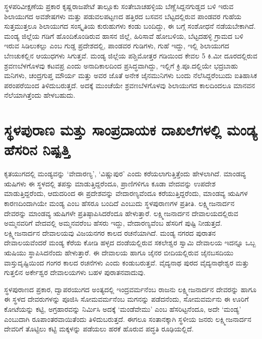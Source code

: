 \vskip -3pt

ಸ್ಥಳಪರಿವೀಕ್ಷಣೆಯ ಪ್ರಕಾರ ಕೃಷ್ಣರಾಜಪೇಟೆ ತಾಲ್ಲೂಕು ಸಂತೇಬಾಚಹಳ್ಳಿಯ ಬೆಣ್ಣೆಸಿದ್ದನಗುಡ್ಡದ ಬಳಿ ಇರುವ \break ಶಿಲಾಯುಗದ ಅವಶೇಷಗಳು ಮತ್ತು ಪಡುವಲಪಟ್ಟಣದ ಹತ್ತಿರದ ಬಸವನ ಬೆಟ್ಟದಲ್ಲಿರುವ ಪಾಂಡವರ ಗುಹೆಯ ಸುತ್ತಮುತ್ತಲೂ ಶಿಲಾಯುಗದ ಸಂಸ್ಕೃತಿಯ ಕುರುಹುಗಳು ಕಂಡು ಬಂದಿದ್ದು, ಈ ಬಗ್ಗೆ ಸಂಶೋಧನೆ ನಡೆಯಬೇಕಾಗಿದೆ. ಮಂಡ್ಯ ಜಿಲ್ಲೆಯ ಗಡಿಗೆ ಹೊಂದಿಕೊಂಡಿರುವ ಹಾಸನ ಜಿಲ್ಲೆ, ಹಿರಿಸಾವೆ ಹೋಬಳಿಯ, ಬೆಟ್ಟದಹಳ್ಳಿ  ಗ್ರಾಮದ ಬಳಿ ಇರುವ ಸಿಡಿಲುಕಲ್ಲು ಎಂಬ ಗುಡ್ಡ ಪ್ರದೇಶದಲ್ಲಿ, ಪಾಂಡವರ ಗುಡಿಗಳು, ಗುಹೆ ಇದ್ದು, ಇಲ್ಲಿ ಶಿಲಾಯುಗದ ಬೆಣಚುಕಲ್ಲಿನ ಆಯುಧಗಳು ಸಿಗುತ್ತವೆ. ಮಂಡ್ಯ ಜಿಲ್ಲೆಯ ಪಶ್ಚಿಮೋತ್ತರ ಗಡಿಯಿಂದ ಕೇವಲ 5 ಕಿ.ಮೀ ದೂರದಲ್ಲಿರುವ ಶ್ರವಣಬೆಳಗೊಳವು ಕಟವಪ್ರ ಎಂದು ಅನಾದಿಕಾಲದಿಂದ ಪ್ರಸಿದ್ಧವಾಗಿದ್ದು, ಇಲ್ಲಿಗೆ ಕ್ರಿ.ಪೂ.ದಲ್ಲಿಯೇ ಭದ್ರಬಾಹು ಮನಿಗಳು, ಚಂದ್ರಗುಪ್ತ ಮೌರ್ಯ ಮತ್ತು ಅವರ ಜೊತೆ ಅನೇಕ ಜೈನಮುನಿಗಳು ಬಂದು ನೆಲೆಸಿದ್ದರೆಂಬುದು ಐತಿಹಾಸಿಕ ಪರಂಪರೆಯಿಂದ ತಿಳಿದುಬರುತ್ತದೆ. ಅದಕ್ಕೆ ಮುಂಚೆಯೇ ಶ್ರವಣಬೆಳಗೊಳವು ಶಿಲಾಯುಗದ ಕಾಲದಿಂದಲೂ ಮಾನವನ ನೆಲೆಯಾಗಿತ್ತೆಂದು ಹೇಳಬಹುದು.


\section*{ಸ್ಥಳಪುರಾಣ ಮತ್ತು ಸಾಂಪ್ರದಾಯಕ ದಾಖಲೆಗಳಲ್ಲಿ ಮಂಡ್ಯ ಹೆಸರಿನ ನಿಷ್ಪತ್ತಿ}

ಕೃತಯುಗದಲ್ಲಿ ಮಂಡ್ಯವನ್ನು ‘ವೇದಾರಣ್ಯ’, ‘ವಿಷ್ಣುಪುರ’ ಎಂದು ಕರೆಯಲಾಗುತ್ತಿತ್ತೆಂದು ಹೇಳಲಾಗಿದೆ. ಮಾಂಡವ್ಯ ಋಷಿಗಳು ಈ ಸ್ಥಳದಲ್ಲಿ ತಪಸ್ಸು ಮಾಡುತ್ತಿದ್ದರೆಂದೂ, ಪ್ರಾಣಿಗಳಿಗೂ ಕೂಡಾ ವೇದವನ್ನು ಉಪದೇಶ ಮಾಡುತ್ತಿದ್ದರೆಂದು, ಆದುದರಿಂದ ಈ ಪ್ರದೇಶವನ್ನು ವೇದಾರಣ್ಯವೆಂದೂ ಕರೆಯುತ್ತಿದ್ದರೆಂದು, ಮಾಂಡವ್ಯ ಋಷಿಗಳ ಕಾರಣದಿಂದಾಗಿಯೇ ಮಂಡ್ಯ ಎಂಬ ಹೆಸರೂ ಬಂದಿದೆ ಎಂಬುದು ಸ್ಥಳಪುರಾಣಗಳ ಪ್ರತೀತಿ. ಲಕ್ಷ್ಮೀಜನಾರ್ದನ ದೇವರನ್ನು ಮಾಂಡವ್ಯ ಋಷಿಗಳೇ ಪ್ರತಿಷ್ಠಾಪಿಸಿದರೆಂದೂ ಹೇಳುತ್ತಾರೆ. ಲಕ್ಷ್ಮೀಜನಾರ್ದನ ದೇವಾಲಯದಲ್ಲಿರುವ ಅಮ್ಮನವರಿಗೆ ವೇದವಲ್ಲಿ ಅಮ್ಮನವರೆಂಬ ಹೆಸರು ಇದ್ದು, ವೇದಾರಣ್ಯವೆಂಬ ಹೆಸರಿಗೆ ಪುಷ್ಟಿ ನೀಡುತ್ತದೆ. ಲಕ್ಷ್ಮೀಜನಾರ್ದನ ದೇವಾಲಯವು ವಿಜಯನಗರ ಕಾಲದ ರಚನೆಯಾಗಿದೆ. ಮಂಡ್ಯ ನಗರದ ಪುರಾತನ ದೇವಾಲಯವೆಂದರೆ ಮಂಡ್ಯ ಕೆರೆಯ ಕೋಡಿ ಹಳ್ಳದ ದಂಡೆಯಲ್ಲಿರುವ ಸಕಲೇಶ್ವರ ಸ್ವಾಮಿ ದೇವಾಲಯ ಇದನ್ನೂ ಒಬ್ಬ ಋಷಿಯು ಸ್ಥಾಪಿಸಿದನೆಂದು ಹೇಳುತ್ತಾರೆ. ಈ ದೇವಾಲಯ ಹಾಗೂ ಜೈನರ ಬೀದಿಯಲ್ಲಿರುವ ಜೈನಬಸದಿಯು ವಾಸ್ತುದೃಷ್ಟಿಯಿಂದ ಗಂಗರ ಕಾಲದ ರಚನೆಗಳು ಎಂದು ಕಂಡುಬರುತ್ತವೆ. ವೈದ್ಯನಾಥ ಪುರದ ವೈದ್ಯನಾಥೇಶ್ವರ ಮತ್ತು ಗುತ್ತಲಿನ ಅರ್ಕೇಶ್ವರ ದೇವಾಲಯಗಳು ಬಹಳ ಪುರಾತನವಾದುವು.

ಸ್ಥಳಪುರಾಣದ ಪ್ರಕಾರ, ದ್ವಾಪರಯುಗದ ಅಂತ್ಯದಲ್ಲಿ ಇಂದ್ರವರ್ಮನೆಂಬ ರಾಜನು ಲಕ್ಷ್ಮೀಜನಾರ್ದನ ದೇವರನ್ನು ಹಾಗೂ ಈ ಸ್ಥಳದ ದೇವರುಗಳನ್ನು ಪೂಜಿಸಿ ಸೋಮವರ್ಮನೆಂಬ ಮಗನನ್ನು ಪಡೆದನೆಂದು, ಸೋಮವರ್ಮನು ಈ ಊರಿಗೆ ಕೋಟೆಯನ್ನು ಕಟ್ಟಿ, ಅಗ್ರಹಾರವನ್ನು ನಿರ್ಮಿಸಿ ಅದಕ್ಕೆ ‘ಮಂಡೆವೇಮು’ ಎಂಬ ಹೆಸರಿಟ್ಟನೆಂದೂ, ಅದೇ ‘ಮಂಡ್ಯ’ ಎಂಬುದಾಗಿ ರೂಪಾಂತರವಾಯಿತೆಂದು ತಿಳಿದುಬರುತ್ತದೆ. ಈಗಲೂ ಸಂತಾನಕ್ಕಾಗಿ ಸ್ಥಳೀಯ ಜನರು ಲಕ್ಷ್ಮೀಜನಾರ್ದನ ದೇವರಿಗೆ ತೊಟ್ಟಿಲು ಕಟ್ಟಿ ಮಕ್ಕಳನ್ನು ಪಡೆಯಲು ಹರಕೆ ಹೊರುವ ಪದ್ಧತಿ ರೂಢಿಯಲ್ಲಿದೆ.

